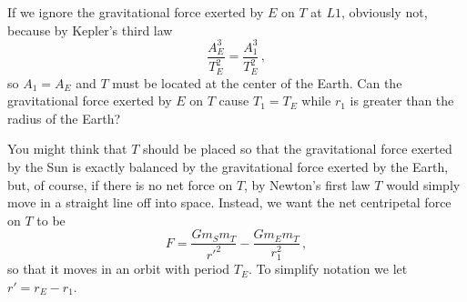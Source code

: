 \newpage

If we ignore the gravitational force exerted by $E$ on $T$ at $L1$, obviously not, because by Kepler's third law
\[
\frac{A_E^3}{T_E^2} = \frac{A_1^3}{T_E^2}\,,
\]
so $A_1=A_E$ and $T$ must be located at the center of the Earth. Can the gravitational force exerted by $E$ on $T$ cause $T_1=T_E$ while $r_1$ is greater than the radius of the Earth?

You might think that $T$ should be placed so that the gravitational force exerted by the Sun is exactly balanced by the gravitational force exerted by the Earth, but, of course, if there is no net force on $T$, by Newton's first law $T$ would simply move in a straight line off into space. Instead, we want the net centripetal force on $T$ to be
\begin{equation}
F = \frac{Gm_Sm_T}{r'^2}-\frac{Gm_Em_T}{r_1^2}\,,\label{eqn.force-diff}
\end{equation}
so that it moves in an orbit with period $T_E$. To simplify notation we let $r'=r_E-r_1$.

